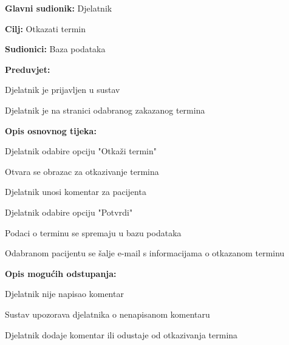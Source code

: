 					\noindent {}
				\begin{packed_item}
					
					\item \textbf{Glavni sudionik: }Djelatnik
					\item  \textbf{Cilj: }Otkazati termin
					\item  \textbf{Sudionici: }Baza podataka
					\item  \textbf{Preduvjet: }
					\item[] \begin{packed_enum}
						
						\item[-] Djelatnik je prijavljen u sustav
						\item[-] Djelatnik je na stranici odabranog zakazanog termina
					\end{packed_enum}
					\item  \textbf{Opis osnovnog tijeka: }
					
					\item[] \begin{packed_enum}
						\item Djelatnik odabire opciju "Otkaži termin"
						\item Otvara se obrazac za otkazivanje termina
						\item Djelatnik unosi komentar za pacijenta
						\item Djelatnik odabire opciju "Potvrdi"
						\item Podaci o terminu se spremaju u bazu podataka
						\item Odabranom pacijentu se šalje e-mail s informacijama o otkazanom terminu
					\end{packed_enum}
					
					\item  \textbf{Opis mogućih odstupanja:}
					
					\item[] \begin{packed_item}
						
						\item[4.a] Djelatnik nije napisao komentar
						\item[] \begin{packed_enum}
							\item Sustav upozorava djelatnika o nenapisanom komentaru
							\item Djelatnik dodaje komentar ili odustaje od otkazivanja termina
						\end{packed_enum}
					\end{packed_item}
				\end{packed_item}
				
